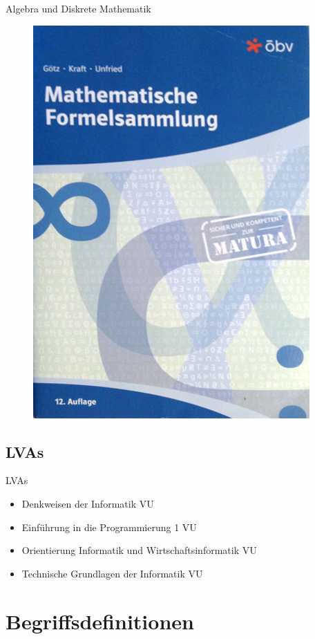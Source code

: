 \documentclass{beamer}
\begin{document}
\begin{frame}{Algebra und Diskrete Mathematik}
    \begin{figure}[htp]
        \centering
        \includegraphics[height=\textheight]{formelsammlung.png}
    \end{figure}
\end{frame}

\subsection{LVAs}
\begin{frame}{LVAs}
    \begin{itemize}
        \item Denkweisen der Informatik VU
        \item Einführung in die Programmierung 1 VU
        \item Orientierung Informatik und Wirtschaftsinformatik VU
        \item Technische Grundlagen der Informatik VU
    \end{itemize}
\end{frame}

\section{Begriffsdefinitionen}
\end{document}
